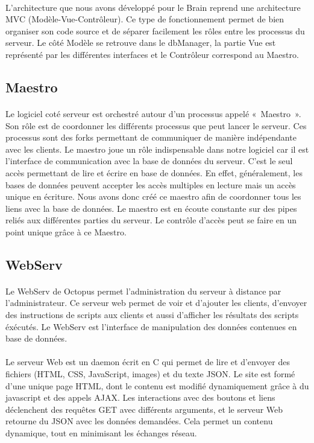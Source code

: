 \paragraph{}
L'architecture que nous avons développé pour le Brain reprend une architecture MVC (Modèle-Vue-Contrôleur). Ce type de fonctionnement permet de bien organiser son code source et de séparer facilement les rôles entre les processus du serveur.
Le côté Modèle se retrouve dans le dbManager, la partie Vue est représenté par les différentes interfaces et le Contrôleur correspond au Maestro.

\subsection{Maestro}
\paragraph{}
Le logiciel coté serveur est orchestré autour d'un processus appelé « Maestro ». Son rôle est de coordonner les différents processus que peut lancer le serveur. Ces processus sont des forks permettant de communiquer de manière indépendante avec les clients. 
Le maestro joue un rôle indispensable dans notre logiciel car il est l'interface de communication avec la base de données du serveur. C'est le seul accès permettant de lire et écrire en base de données. En effet, généralement, les bases de données peuvent accepter les accès multiples en lecture mais un accès unique en écriture. Nous avons donc créé ce maestro afin de coordonner tous les liens avec la base de données.
Le maestro est en écoute constante sur des pipes reliés aux différentes parties du serveur. Le contrôle d'accès peut se faire en un point unique grâce à ce Maestro.

\subsection{WebServ}
\paragraph{}
Le WebServ de Octopus permet l’administration du serveur à distance par l’administrateur. 
Ce serveur web permet de voir et d’ajouter les clients, d’envoyer des instructions de scripts aux clients et aussi d’afficher les résultats des scripts éxécutés. 
Le WebServ est l'interface de manipulation des données contenues en base de données. 
\paragraph{}
Le serveur Web est un daemon écrit en C qui permet de lire et d’envoyer des fichiers (HTML, CSS, JavaScript, images) et du texte JSON. 
Le site est formé d'une unique page HTML, dont le contenu est modifié dynamiquement grâce à du javascript et des appels AJAX. 
Les interactions avec des boutons et liens déclenchent des requêtes GET avec différents arguments, et le serveur Web retourne du JSON avec les données demandées. 
Cela permet un contenu dynamique, tout en minimisant les échanges réseau.


